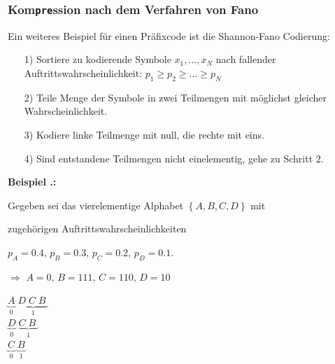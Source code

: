 \documentclass[a4paper,12pt]{article}
\newcounter{Beispiel}
\newenvironment{Beispiel}{
\medskip
        
        \setlength{\parindent}{0pt}
        \addtocounter{Beispiel}{1}
        \textbf{\textsf{Beispiel \thesubsection.\theBeispiel}:}\\}{
        \nopagebreak
        \vspace{-1.0ex}
        \bigskip
        
}
\begin{document}
\subsubsection{Kom{\tt{pre}}ssion nach dem Verfahren von Fano}
Ein weiteres Beispiel für einen Präfixcode ist die Shannon-Fano Codierung:
\begin{itemize}
\item[1)] Sortiere zu kodierende Symbole $x_{1},\ldots,x_{N}$ nach fallender Auftrittswahrscheinlichkeit: 
$p_{1}\geq p_{2}\geq\ldots\geq p_{N}$
\item[2)] Teile Menge der Symbole in zwei Teilmengen mit möglichst gleicher Wahrscheinlichkeit.
\item[3)] Kodiere linke Teilmenge mit null, die rechte mit eins.
\item[4)] Sind entstandene Teilmengen nicht einelementig, gehe zu Schritt 2.
\end{itemize}
\begin{Beispiel}
\begin{minipage}[h]{.7\textwidth}
Gegeben sei das vierelementige Alphabet $\left\{A, B, C, D\right\}$ mit 
\par
 zugehörigen Auftrittswahrscheinlichkeiten
\begin{center}
 $p_A =0.4,\, p_B = 0.3,\, p_C = 0.2,\, p_D =0.1$.
\end{center}
\qquad\qquad$\Rightarrow$ $A=0,\,B=111,\,C=110,\,D=10$
\\
\vspace{0.2cm}
\end{minipage}
\hfill
 \begin{minipage}[h]{.2\textwidth}
\begin{flushright}
$\underbrace{A}_{0} \;\underbrace{D\; C\; B\;}_{1}$
\\
\quad$\underbrace{D}_{0}\;\underbrace{C\; B\;}_{1}$
\\
\quad\quad$\underbrace{C}_{0}\;\underbrace{B}_{1}$
\end{flushright}
\end{minipage}    
\end{Beispiel}
\end{document}
